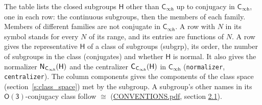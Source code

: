 \documentclass[10pt,a4paper]{article}
\numberwithin{equation}{section}
\newcommand{\grp}[1]{\mathsf{#1}}
\newcommand{\samecls}{\cong}
\newcommand{\hairsp}{\mkern1mu}
\begin{document}
\leavevmode\label{n:group.H}The table lists the closed subgroups $\grp{H}$ other than $\grp{C_{\infty h}}$ up to conjugacy in $\grp{C_{\infty h}}$, one in each row: the continuous subgroups, then the members of each family. Members of different families are not conjugate in $\grp{C_{\infty h}}$. A row with $N$ in its symbol stands for every $N$ of its range, and its entries are functions of $N$. \label{n:head.subgroup}\label{n:head.order}\label{n:head.conjugates}\label{n:head.normal}A row gives the representative $\grp{H}$ of a class of subgroups (subgrp), its order, the number of subgroups in the class (conjugates) and whether $\grp{H}$ is normal. \label{n:group.normalizer}\label{n:group.centralizer}It also gives the normalizer $\grp{N}_{\hairsp \grp{C_{\infty h}}}(\grp{H})$ and the centralizer $\grp{C}_{\hairsp \grp{C_{\infty h}}}(\grp{H})$ in $\grp{C_{\infty h}}$ (\texttt{normalizer}, \texttt{centralizer}). \label{n:head.components}The column components gives the components of the class space (section~\ref{s:class_space}) met by the subgroup. A subgroup's other names in its \href{O3.pdf}{$\grp{O(3)}$}-conjugacy class follow $\samecls$ (\href{../../CONVENTIONS.pdf}{CONVENTIONS.pdf}, section \href{../../CONVENTIONS.pdf\#conv.2.1}{2.1}).
\end{document}
